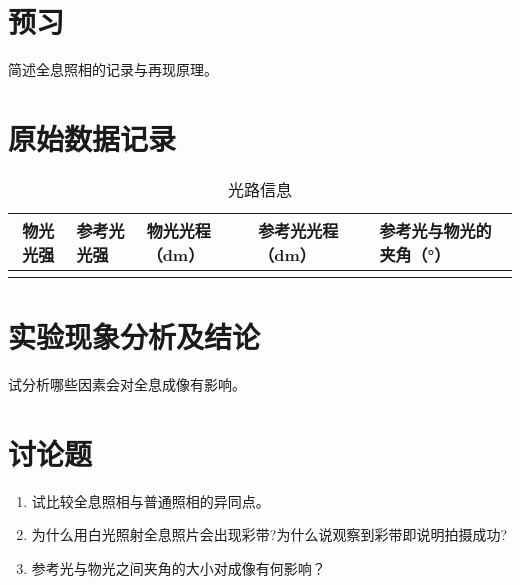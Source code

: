 \documentclass[signature=preparation]{physicsreport}
\begin{document}
\maketitle

\section{预习}
简述全息照相的记录与再现原理。

\newpage

\section{原始数据记录}


\begin{table*}[ht]
    \renewcommand{\arraystretch}{1.4}
    \small\selectfont
    \centering
    \caption{光路信息}
    \begin{tabularx}{\textwidth}{|c|Y|Y|Y|Y|}\hline
        物光光强 & 参考光光强  & 物光光程（dm） & 参考光光程（dm）  & 参考光与物光的夹角（°） \\\hline
                &            &               &                  &                       \\\hline
    \end{tabularx}
\end{table*}

\makeatletter
{}
\makeatother

\newpage

\section{实验现象分析及结论}
试分析哪些因素会对全息成像有影响。
\vspace*{8cm}

\section{讨论题}
\begin{enumerate}
    \item 试比较全息照相与普通照相的异同点。
    \item 为什么用白光照射全息照片会出现彩带?为什么说观察到彩带即说明拍摄成功?
    \item 参考光与物光之间夹角的大小对成像有何影响？
\end{enumerate}
\end{document}
